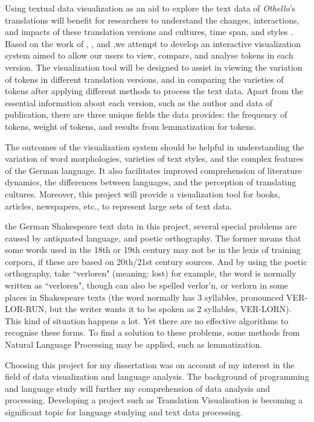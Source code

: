 Using textual data visualization as an aid to explore the text data of \emph{Othello}’s translations will  benefit for researchers to understand the changes, interactions, and impacts of these translation versions and cultures, time span, and styles \cite{Alrehiely2014}. Based on the work of \cite{Geng2015}, \cite{Alrehiely2014}, and \cite{Tom2012a},we attempt to develop an interactive visualization system aimed to allow our users to view, compare, and analyse tokens in each version. The visualization tool will be designed to assist in viewing the variation of tokens in different translation versions, and in comparing the varieties of tokens after applying different methods to process the text data. Apart from the essential information about each version, such as the author and data of publication, there are three unique fields the data provides: the frequency of tokens, weight of tokens, and results from lemmatization for tokens.

The outcomes of the visualization system should be helpful in understanding the variation of word morphologies, varieties of text styles, and the complex features of the German language. It also facilitates improved comprehension of literature dynamics, the differences between languages, and the perception of translating cultures. Moreover, this project will provide a visualization tool for books, articles, newspapers, etc., to represent large sets of text data.  

the German Shakespeare text data in this project, several special problems are caused by antiquated language, and poetic orthography. The former means that some words used in the 18th or 19th century may not be in the lexis of training corpora, if these are based on 20th/21st century sources. And by using the poetic orthography, take “verloren" (meaning: lost) for example, the word is normally written as “verloren", though can also be spelled verlor'n, or verlorn in some places in Shakespeare texts (the word normally has 3 syllables, pronounced VER-LOR-RUN, but the writer wants it to be spoken as 2 syllables, VER-LORN). This kind of situation happens a lot. Yet there are no effective algorithms to recognise these forms. To find a solution to these problems, some methods from Natural Language Processing may be applied, such as lemmatization.

Choosing this project for my dissertation was on account of my interest in the field of data visualization and language analysis. The background of programming and language study will further my comprehension of data analysis and processing. Developing a project such as Translation Visualisation is becoming a significant topic for language studying and text data processing.

